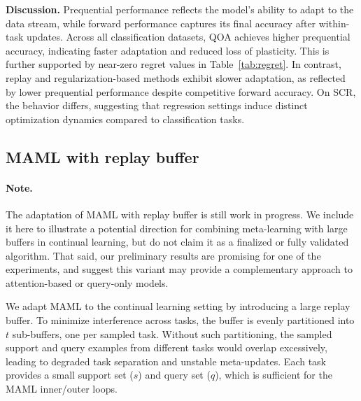 \documentclass{article}
\begin{document}
\vspace{2mm}

\label{fig:app_all_results}

\noindent\textbf{Discussion.}
Prequential performance reflects the model’s ability to adapt to the data stream, while forward performance captures its final accuracy after within-task updates. Across all classification datasets, QOA achieves higher prequential accuracy, indicating faster adaptation and reduced loss of plasticity. This is further supported by near-zero regret values in Table~\ref{tab:regret}. In contrast, replay and regularization-based methods exhibit slower adaptation, as reflected by lower prequential performance despite competitive forward accuracy. On SCR, the behavior differs, suggesting that regression settings induce distinct optimization dynamics compared to classification tasks.

\subsection{MAML with replay buffer}
\paragraph{Note.} 
The adaptation of MAML with replay buffer is still work in progress. 
We include it here to illustrate a potential direction for combining meta-learning with large 
buffers in continual learning, but do not claim it as a finalized or fully validated algorithm. 
That said, our preliminary results are promising for one of the experiments, and suggest this variant may provide 
a complementary approach to attention-based or query-only models.  

We adapt MAML to the continual learning setting by introducing a large replay buffer. 
To minimize interference across tasks, the buffer is evenly partitioned into $t$ sub-buffers, 
one per sampled task. Without such partitioning, the sampled support and query examples 
from different tasks would overlap excessively, leading to degraded task separation 
and unstable meta-updates. Each task provides a small support set ($s$) and query set ($q$), 
which is sufficient for the MAML inner/outer loops.  
\end{document}
